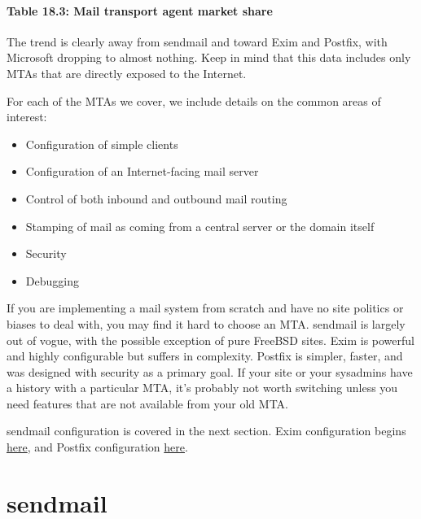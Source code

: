 \paragraph[{Table 18.3: }Mail transport agent market
share]{\texorpdfstring{{Table 18.3:
}\protect\hypertarget{part0026_split_023.htmlux5cux23_idTextAnchor1041}{}{}\protect\hypertarget{part0026_split_023.htmlux5cux23_idTextAnchor1042}{}{}Mail
transport agent market
share}{Table 18.3: Mail transport agent market share}}


\protect\hypertarget{part0026_split_023.htmlux5cux23_idIndexMarker2492}{}{}The
trend is clearly away from {sendmail} and toward Exim and Postfix, with
Microsoft dropping to almost nothing. Keep in mind that this data
includes only MTAs that are directly exposed to the Internet.

For each of the MTAs we cover, we include details on the common areas of
interest:

\begin{itemize}
\item
  Configuration of simple clients
\item
  Configuration of an Internet-facing mail server
\item
  Control of both inbound and outbound mail routing
\item
  Stamping of mail as coming from a central server or the domain itself
\item
  Security
\item
  Debugging
\end{itemize}

If you are implementing a mail system from scratch and have no site
politics or biases to deal with, you may find it hard to choose an MTA.
{sendmail} is largely out of vogue, with the possible exception of pure
FreeBSD sites. Exim is powerful and highly configurable but suffers in
complexity. Postfix is simpler, faster, and was designed with security
as a primary goal. If your site or your sysadmins have a history with a
particular MTA, it's probably not worth switching unless you need
features that are not available from your old MTA.

{sendmail} configuration is covered in the next section. Exim
configuration begins
\protect\hyperlink{part0026_split_040.htmlux5cux23_idTextAnchor1125}{here},
and Postfix configuration
\protect\hyperlink{part0026_split_057.htmlux5cux23_idTextAnchor1163}{here}.


\section{sendmail}

